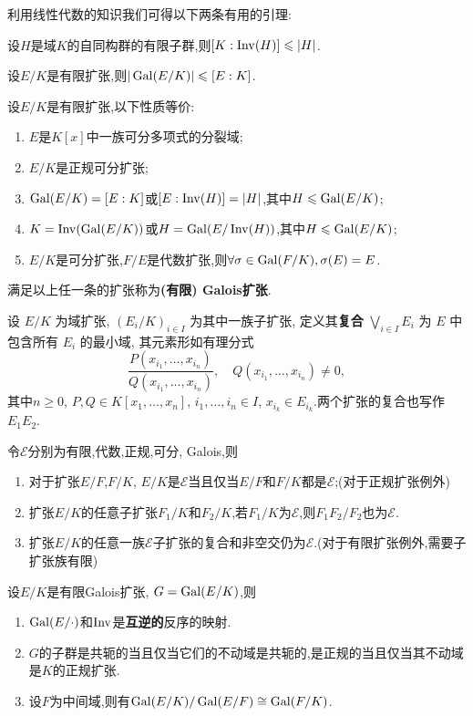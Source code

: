 利用线性代数的知识我们可得以下两条有用的引理:
\begin{lemma}[Artin]
	设$H$是域$K$的自同构群的有限子群,则$[K:\operatorname{\mathrm{Inv}}(H)]\leqslant|H|$.
\end{lemma}
\begin{lemma}
	设$E/K$是有限扩张,则$|\operatorname{\mathrm{Gal}}(E/K)|\leqslant[E:K]$.
\end{lemma}
\begin{definition}\label{def:Galois-ext} 
	设$E/K$是有限扩张,以下性质等价:
	\begin{enumerate}
		\item $E$是$K[x]$中一族可分多项式的分裂域;
		\item $E/K$是正规可分扩张;
		\item $\operatorname{\mathrm{Gal}}(E/K)=[E:K]$或$[E:\operatorname{\mathrm{Inv}}(H)]=|H|$,其中$H\leqslant\operatorname{\mathrm{Gal}}(E/K)$;
		\item $K=\operatorname{\mathrm{Inv}}(\operatorname{\mathrm{Gal}}(E/K))$或$H=\operatorname{\mathrm{Gal}}(E/\operatorname{\mathrm{Inv}}(H))$,其中$H\leqslant\operatorname{\mathrm{Gal}}(E/K)$;
		\item $E/K$是可分扩张,$F/E$是代数扩张,则$\forall\sigma\in\operatorname{\mathrm{Gal}}(F/K),\sigma(E)=E$.
	\end{enumerate}
	满足以上任一条的扩张称为\textbf{(有限) Galois扩张}.
\end{definition}
\begin{definition}
	设 $E/K$ 为域扩张, $(E_i/K)_{i \in I}$ 为其中一族子扩张, 定义其\textbf{复合} $\bigvee_{i \in I} E_i$ 为 $E$ 中包含所有 $E_i$ 的最小域, 其元素形如有理分式
	\[
	\frac{P(x_{i_1}, \dots, x_{i_n})}{Q(x_{i_1}, \dots, x_{i_n})}, \quad Q(x_{i_1}, \dots, x_{i_n}) \neq 0,
	\]
	其中$n \geqslant 0$, $P, Q \in K[x_1, \dots, x_n]$, $i_1, \dots, i_n \in I$, $x_{i_k} \in E_{i_k}$.两个扩张的复合也写作 $E_1 E_2$.
\end{definition}
\begin{proposition}
	令$\mathcal{E}$分别为有限,代数,正规,可分, Galois,则
	\begin{enumerate}
		\item 对于扩张$E/F$,$F/K$, $E/K$是$\mathcal{E}$当且仅当$E/F$和$F/K$都是$\mathcal{E}$;(对于正规扩张例外)
		\item 扩张$E/K$的任意子扩张$F_1/K$和$F_2/K$,若$F_1/K$为$\mathcal{E}$,则$F_1F_2/F_2$也为$\mathcal{E}$.
		\item 扩张$E/K$的任意一族$\mathcal{E}$子扩张的复合和非空交仍为$\mathcal{E}$.(对于有限扩张例外,需要子扩张族有限)
	\end{enumerate}
\end{proposition}
\begin{theorem}[Galois理论基本定理]\label{thm:finite-Galois-corr}
	设$E/K$是有限Galois扩张, $G=\operatorname{\mathrm{Gal}}(E/K)$,则
	\begin{enumerate}
		\item $\operatorname{\mathrm{Gal}}(E/\cdot)$和$\operatorname{\mathrm{Inv}}$是\textbf{互逆的}反序的映射.
		\item $G$的子群是共轭的当且仅当它们的不动域是共轭的,是正规的当且仅当其不动域是$K$的正规扩张.
		\item 设$F$为中间域,则有$\operatorname{\mathrm{Gal}}(E/K)/\operatorname{\mathrm{Gal}}(E/F)\cong\operatorname{\mathrm{Gal}}(F/K)$.
	\end{enumerate}
\end{theorem}

